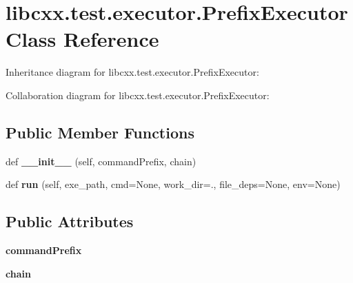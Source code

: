 \hypertarget{classlibcxx_1_1test_1_1executor_1_1_prefix_executor}{}\section{libcxx.\+test.\+executor.\+Prefix\+Executor Class Reference}
\label{classlibcxx_1_1test_1_1executor_1_1_prefix_executor}


Inheritance diagram for libcxx.\+test.\+executor.\+Prefix\+Executor\+:


Collaboration diagram for libcxx.\+test.\+executor.\+Prefix\+Executor\+:
\subsection*{Public Member Functions}
\begin{DoxyCompactItemize}
\item 
\mbox{\label{classlibcxx_1_1test_1_1executor_1_1_prefix_executor_aa097a33700812d2eaf0281538677a948}} 
def {\bfseries \+\_\+\+\_\+init\+\_\+\+\_\+} (self, command\+Prefix, chain)
\item 
\mbox{\label{classlibcxx_1_1test_1_1executor_1_1_prefix_executor_aa4e5ead0ea8bece523e2be8e0595c08c}} 
def {\bfseries run} (self, exe\+\_\+path, cmd=None, work\+\_\+dir=\textquotesingle{}.\textquotesingle{}, file\+\_\+deps=None, env=None)
\end{DoxyCompactItemize}
\subsection*{Public Attributes}
\begin{DoxyCompactItemize}
\item 
\mbox{\label{classlibcxx_1_1test_1_1executor_1_1_prefix_executor_abb4f371dc3fbaadbbeb756902f6a6709}} 
{\bfseries command\+Prefix}
\item 
\mbox{\label{classlibcxx_1_1test_1_1executor_1_1_prefix_executor_ac216aef38c2625282428689adbb91e92}} 
{\bfseries chain}
\end{DoxyCompactItemize}


